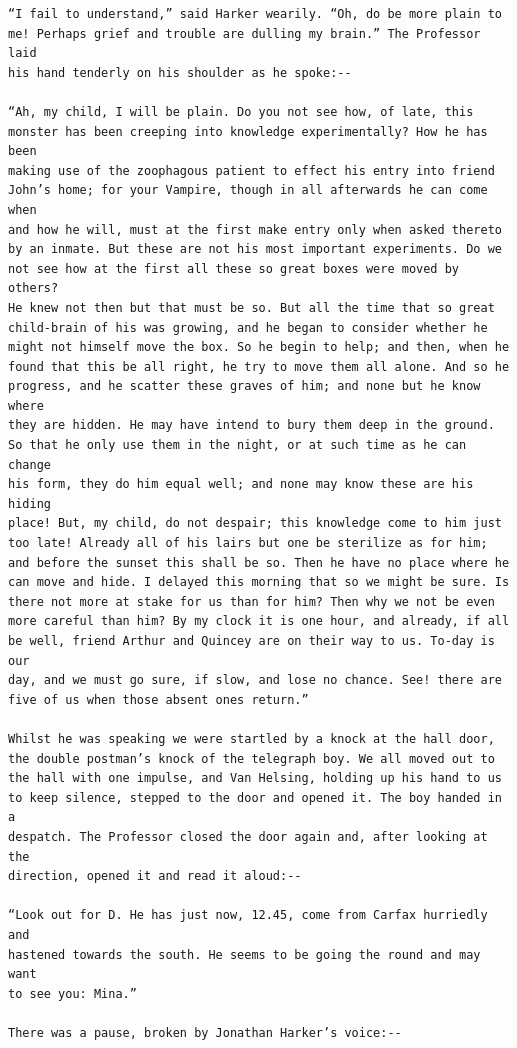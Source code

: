 \documentclass{article}
\begin{document}
\begin{verbatim}
“I fail to understand,” said Harker wearily. “Oh, do be more plain to
me! Perhaps grief and trouble are dulling my brain.” The Professor laid
his hand tenderly on his shoulder as he spoke:--

“Ah, my child, I will be plain. Do you not see how, of late, this
monster has been creeping into knowledge experimentally? How he has been
making use of the zoophagous patient to effect his entry into friend
John’s home; for your Vampire, though in all afterwards he can come when
and how he will, must at the first make entry only when asked thereto
by an inmate. But these are not his most important experiments. Do we
not see how at the first all these so great boxes were moved by others?
He knew not then but that must be so. But all the time that so great
child-brain of his was growing, and he began to consider whether he
might not himself move the box. So he begin to help; and then, when he
found that this be all right, he try to move them all alone. And so he
progress, and he scatter these graves of him; and none but he know where
they are hidden. He may have intend to bury them deep in the ground.
So that he only use them in the night, or at such time as he can change
his form, they do him equal well; and none may know these are his hiding
place! But, my child, do not despair; this knowledge come to him just
too late! Already all of his lairs but one be sterilize as for him;
and before the sunset this shall be so. Then he have no place where he
can move and hide. I delayed this morning that so we might be sure. Is
there not more at stake for us than for him? Then why we not be even
more careful than him? By my clock it is one hour, and already, if all
be well, friend Arthur and Quincey are on their way to us. To-day is our
day, and we must go sure, if slow, and lose no chance. See! there are
five of us when those absent ones return.”

Whilst he was speaking we were startled by a knock at the hall door,
the double postman’s knock of the telegraph boy. We all moved out to
the hall with one impulse, and Van Helsing, holding up his hand to us
to keep silence, stepped to the door and opened it. The boy handed in a
despatch. The Professor closed the door again and, after looking at the
direction, opened it and read it aloud:--

“Look out for D. He has just now, 12.45, come from Carfax hurriedly and
hastened towards the south. He seems to be going the round and may want
to see you: Mina.”

There was a pause, broken by Jonathan Harker’s voice:--


\end{verbatim}
\end{document}
